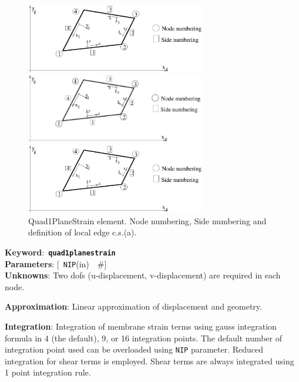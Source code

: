 \documentclass[a4paper]{article}
\newcommand{\descitem}[1]{{\noindent \bf #1}:}
\newcommand{\elemkeyword}[1]{\descitem{Keyword}~{\bf \texttt{#1}}}
\newcommand{\elemparam}[2]{{{\texttt{#1}\tiny (#2)}~~\#}}
\newcommand{\optelemparam}[2]{{[~\elemparam{#1}{#2}]}}
\newcommand{\param}[1]{{\texttt{#1}}}
\begin{document}
\begin{figure}[tb]
\begin{htmlonly}
  \centerline{\includegraphics[width=0.7\textwidth]{planestress2d.eps}}
\end{htmlonly}
\ifpdf
\centerline{\includegraphics[width=0.7\textwidth]{planestress2d.pdf}}
\else
\centerline{\includegraphics[width=0.7\textwidth]{planestress2d.eps}}
\fi
\caption{Quad1PlaneStrain element. Node numbering, Side numbering and
definition of local edge c.s.(a).}
\label{Quad1PlaneStrainfig}
\end{figure}

\elemkeyword{quad1planestrain}\\
\descitem{Parameters} \optelemparam{NIP}{in}\\
\descitem{Unknowns}
Two dofs (u-displacement, v-displacement) are required in each node.

\descitem{Approximation} Linear approximation of displacement and
geometry.

\descitem{Integration}
Integration of membrane strain terms using gauss integration formula
in 4 (the default), 9, or 16 integration points. The default number of
integration point used can be overloaded using \param{NIP} parameter.
Reduced integration for shear terms is employed. Shear terms are
always integrated using 1 point integration rule.
\end{document}
